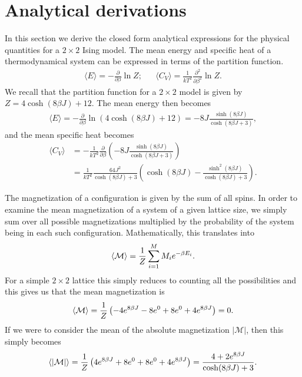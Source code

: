 \section{Analytical derivations}
\label{sec:analytical_derivations}

In this section we derive the closed form analytical expressions for the
physical quantities for a $2\times2$ Ising model. The mean energy and specific
heat of a thermodynamical system can be expressed in terms of the partition
function.
\begin{align*}
  \langle E \rangle = - \frac{\partial}{\partial \beta} \ln Z; &&  \langle C_V \rangle = \frac{1}{kT^2}\frac{\partial^2}{\partial\beta^2}\ln Z.
\end{align*}
We recall that the partition function for a $2\times2$ model is given by ${Z = 4\cosh(8\beta J) + 12}$. The mean energy then becomes
\begin{align*}
  \langle E \rangle = -\frac{\partial}{\partial\beta} \ln \left( 4\cosh(8\beta J) + 12 \right) = -8J\frac{\sinh(8\beta J)}{\cosh(8\beta J+3)}, 
\end{align*} 
and the mean specific heat becomes
\begin{align*}
  \langle C_V \rangle  &= -\frac{1}{kT^2}\frac{\partial}{\partial\beta}\left(-8J\frac{\sinh(8\beta J)}{\cosh(8\beta J+3)}\right)\\
                       &= \frac{1}{kT^2}\frac{64J^2}{\cosh(8\beta J)+3} \left( \cosh(8\beta J) - \frac{\sinh^2(8\beta J)}{\cosh(8\beta J)+3} \right).
\end{align*}

The magnetization of a configuration is given by the sum of all spins. In order
to examine the mean magnetization of a system of a given lattice size, we
simply sum over all possible magnetizations multiplied by the probability of
the system being in each such configuration. Mathematically, this translates into
\begin{equation}
  \notag
  \langle \mathcal{M} \rangle = \frac{1}{Z} \sum^{M}_{i=1} M_i e^{-\beta E_i}.
\end{equation}
For a simple $2\times2$ lattice this simply reduces to counting all the
possibilities and this gives us that the mean magnetization is
\begin{equation}
  \notag
  \langle \mathcal{M} \rangle = \frac{1}{Z} \left( -4e^{8\beta J} - 8e^0 + 8e^0 + 4e^{8\beta J} \right) = 0.
\end{equation}
If we were to consider the mean of the absolute magnetization $|\mathcal{M}|$, then this simply becomes
\begin{equation}
  \notag
  \langle |\mathcal{M}| \rangle = \frac{1}{Z} \left( 4e^{8\beta J} + 8e^0 + 8e^0 + 4e^{8\beta J} \right) = \frac{4 + 2e^{8\beta J}}{\cosh(8\beta J)+3}.
\end{equation}

